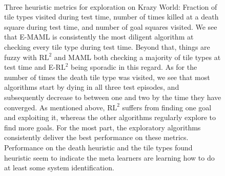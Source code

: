 \documentclass{article} %
\begin{document}
\begin{figure}[h!]
\begin{center}
\hfill
{}\\
\end{center}
\caption{Three heuristic metrics for exploration on Krazy World: Fraction of tile types visited during test time, number of times killed at a death square during test time, and number of goal squares visited. We see that E-MAML is consistently the most diligent algorithm at checking every tile type during test time. Beyond that, things are fuzzy with $\text{RL}^2$ and MAML both checking a majority of tile types at test time and E-$\text{RL}^2$ being sporadic in this regard. As for the number of times the death tile type was visited, we see that most algorithms start by dying in all three test episodes, and subsequently decrease to between one and two by the time they have converged. As mentioned above, $\text{RL}^2$ suffers from finding one goal and exploiting it, whereas the other algorithms regularly explore to find more goals. For the most part, the exploratory algorithms consistently deliver the best performance on these metrics. Performance on the death heuristic and the tile types found heuristic seem to indicate the meta learners are learning how to do at least some system identification.}
\label{fig:hs}
\end{figure} 
\end{document}
